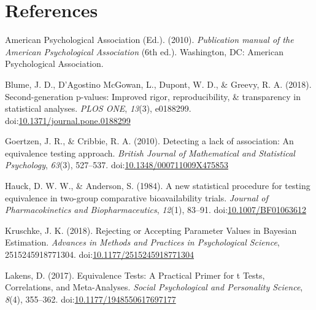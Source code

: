 \documentclass[,man,floatsintext]{apa6}
\begin{document}
\newpage

\hypertarget{references}{%
\section{References}\label{references}}

\setlength{\parindent}{-0.5in}
\setlength{\leftskip}{0.5in}

\hypertarget{refs}{}
\leavevmode\hypertarget{ref-american_psychological_association_publication_2010}{}%
American Psychological Association (Ed.). (2010). \emph{Publication manual of the American Psychological Association} (6th ed.). Washington, DC: American Psychological Association.

\leavevmode\hypertarget{ref-blume_second-generation_2018}{}%
Blume, J. D., D'Agostino McGowan, L., Dupont, W. D., \& Greevy, R. A. (2018). Second-generation p-values: Improved rigor, reproducibility, \& transparency in statistical analyses. \emph{PLOS ONE}, \emph{13}(3), e0188299. doi:\href{https://doi.org/10.1371/journal.pone.0188299}{10.1371/journal.pone.0188299}

\leavevmode\hypertarget{ref-goertzen_detecting_2010}{}%
Goertzen, J. R., \& Cribbie, R. A. (2010). Detecting a lack of association: An equivalence testing approach. \emph{British Journal of Mathematical and Statistical Psychology}, \emph{63}(3), 527--537. doi:\href{https://doi.org/10.1348/000711009X475853}{10.1348/000711009X475853}

\leavevmode\hypertarget{ref-hauck_new_1984}{}%
Hauck, D. W. W., \& Anderson, S. (1984). A new statistical procedure for testing equivalence in two-group comparative bioavailability trials. \emph{Journal of Pharmacokinetics and Biopharmaceutics}, \emph{12}(1), 83--91. doi:\href{https://doi.org/10.1007/BF01063612}{10.1007/BF01063612}

\leavevmode\hypertarget{ref-kruschke_rejecting_2018}{}%
Kruschke, J. K. (2018). Rejecting or Accepting Parameter Values in Bayesian Estimation. \emph{Advances in Methods and Practices in Psychological Science}, 2515245918771304. doi:\href{https://doi.org/10.1177/2515245918771304}{10.1177/2515245918771304}

\leavevmode\hypertarget{ref-lakens_equivalence_2017}{}%
Lakens, D. (2017). Equivalence Tests: A Practical Primer for t Tests, Correlations, and Meta-Analyses. \emph{Social Psychological and Personality Science}, \emph{8}(4), 355--362. doi:\href{https://doi.org/10.1177/1948550617697177}{10.1177/1948550617697177}
\end{document}
